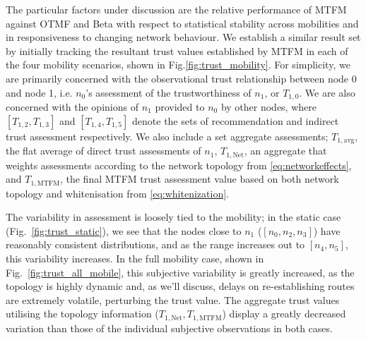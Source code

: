 \documentclass[runningheads,a4paper]{llncs}
\begin{document}
The particular factors under discussion are the relative performance of MTFM against OTMF and Beta with respect to statistical stability across mobilities and in responsiveness to changing network behaviour. 
We establish a similar result set by initially tracking the resultant trust values established by MTFM in each of the four mobility scenarios, shown in Fig.\ref{fig:trust_mobility}.
For simplicity, we are primarily concerned with the observational trust relationship between node 0 and node 1, i.e. $n_0$'s assessment of the trustworthiness of $n_1$, or $T_{1,0}$.
We are also concerned with the opinions of $n_1$ provided to $n_0$ by other nodes, where $[T_{1,2},T_{1,3}]$ and $[T_{1,4},T_{1,5}]$ denote the sets of recommendation and indirect trust assessment respectively.
We also include a set  aggregate assessments; $T_{1,\text{avg}}$, the flat average of direct trust assessments of $n_1$, $T_{1,\text{Net}}$, an aggregate that weights assessments according to the network topology from \eqref{eq:networkeffects}, and $T_{1,\text{MTFM}}$, the final MTFM trust assessment value based on both network topology and whitenisation from \eqref{eq:whitenization}.

The variability in assessment is loosely tied to the mobility; in the static case (Fig.~\ref{fig:trust_static}), we see that the nodes close to $n_1$ ($[n_0,n_2,n_3]$) have reasonably consistent distributions, and as the range increases out to $[n_4,n_5]$, this variability increases.
In the full mobility case, shown in Fig.~\ref{fig:trust_all_mobile}, this subjective variability is greatly increased, as the topology is highly dynamic and, as we'll discuss, delays on re-establishing routes are extremely volatile, perturbing the trust value.
The aggregate trust values utilising the topology information ($T_{1,\text{Net}},T_{1,\text{MTFM}}$) display a greatly decreased variation than those of the individual subjective observations in both cases.
\end{document}
